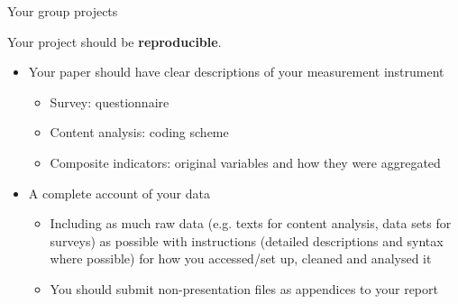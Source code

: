 \documentclass[10pt]{beamer}
\begin{document}
\begin{frame}{Your group projects}

    Your project should be \textbf{reproducible}.

    \begin{itemize}
        \item Your paper should have clear descriptions of your measurement instrument
        \begin{itemize}
            \item Survey: questionnaire
            \item Content analysis: coding scheme
            \item Composite indicators: original variables and how they were aggregated
        \end{itemize}

        \item A complete account of your data
        \begin{itemize}
            \item Including as much raw data (e.g. texts for content analysis, data sets for surveys) as possible with instructions (detailed descriptions and syntax where possible) for how you accessed/set up, cleaned and analysed it
            \item You should submit non-presentation files as appendices to your report
        \end{itemize}

    \end{itemize}

\end{frame}
\end{document}
